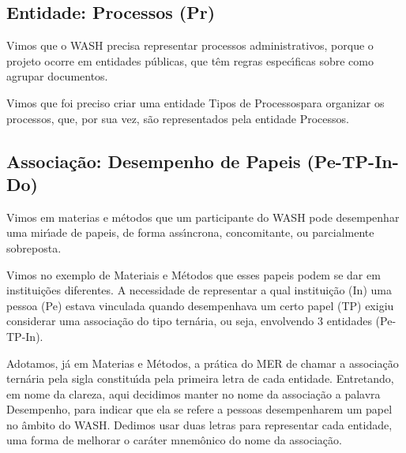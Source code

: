 \documentclass[
12pt,		%
openright,	%
twoside,  %
a4paper,			%
chapter=TITLE,		%
english,			%
french,				%
spanish,			%
brazil				%
]{USPSC-classe/USPSC}
\begin{document}
\subsection[Entidade: Processos (Pr)]{Entidade: Processos (Pr)}\label{Entidade: Processos (Pr)}
Vimos que o WASH precisa representar processos administrativos, porque o projeto ocorre em entidades p\'ublicas, que t\^em regras espec\'{\i}ficas sobre como agrupar documentos.









Vimos que foi preciso criar uma entidade \textquotedbl Tipos de Processos\textquotedbl  para organizar os processos, que, por sua vez, s\~ao representados pela entidade \textquotedbl Processos\textquotedbl .









\subsection[Associa\c{c}\~ao: Desempenho de Papeis (Pe-TP-In-Do)]{Associa\c{c}\~ao: Desempenho de Papeis (Pe-TP-In-Do)}\label{Associa\c{c}\~ao: Desempenho de Papeis (Pe-TP-In-Do)}
Vimos em materias e m\'etodos que um participante do WASH pode desempenhar uma mir\'{\i}ade de papeis, de forma ass\'{\i}ncrona, concomitante, ou parcialmente sobreposta.









Vimos no exemplo de Materiais e M\'etodos que esses papeis podem se dar em institui\c{c}\~oes diferentes. A necessidade de representar a qual institui\c{c}\~ao (In) uma pessoa (Pe) estava vinculada quando desempenhava um certo papel (TP) exigiu considerar uma associa\c{c}\~ao do tipo tern\'aria, ou seja, envolvendo 3 entidades (Pe-TP-In).









Adotamos, j\'a em Materias e M\'etodos, a pr\'atica do MER de chamar a associa\c{c}\~ao tern\'aria pela sigla constitu\'{\i}da pela primeira letra de cada entidade. Entretando, em nome da clareza, aqui decidimos manter no nome da associa\c{c}\~ao a palavra \textquotedbl Desempenho\textquotedbl , para indicar que ela se refere a \textquotedbl pessoas desempenharem um papel no \^ambito do WASH\textquotedbl . Dedimos usar duas letras para representar cada entidade, uma forma de melhorar o car\'ater mnem\^onico do nome da associa\c{c}\~ao.
\end{document}
